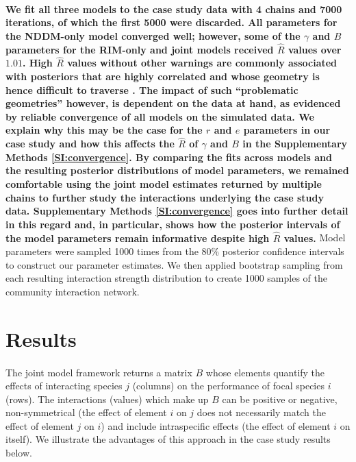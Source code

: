 \documentclass[a4,12pt]{article}
\begin{document}
\begin{refsection}
        \paragraph{}
        \textbf{We fit all three models to the case study data with 4 chains and 7000 iterations, of which the first 5000 were discarded. All parameters for the NDDM-only model converged well; however, some of the $\gamma$ and $B$ parameters for the RIM-only and joint models received $\hat{R}$ values over $1.01$. High $\hat{R}$ values without other warnings are commonly associated with posteriors that are highly correlated and whose geometry is hence difficult to traverse \parencite{Team2022}. The impact of such ``problematic geometries'' however, is dependent on the data at hand, as evidenced by reliable convergence of all models on the simulated data. We explain why this may be the case for the $r$ and $e$ parameters in our case study and how this affects the $\hat{R}$ of $\gamma$ and $B$ in the Supplementary Methods \ref{SI:convergence}. By comparing the fits across models and the resulting posterior distributions of model parameters, we remained comfortable using the joint model estimates returned by multiple chains to further study the interactions underlying the case study data. Supplementary Methods \ref{SI:convergence} goes into further detail in this regard and, in particular, shows how the posterior intervals of the model parameters remain informative despite high $\hat{R}$ values.} Model parameters were sampled 1000 times from the 80\% posterior confidence intervals to construct our parameter estimates. We then applied bootstrap sampling from each resulting interaction strength distribution to create 1000 samples of the community interaction network.

\section{Results}
    
    \paragraph{}
    The joint model framework returns a matrix $B$ whose elements quantify the effects of interacting species $j$ (columns) on the performance of focal species $i$ (rows). The interactions (values) which make up $B$ can be positive or negative, non-symmetrical (the effect of element $i$ on $j$ does not necessarily match the effect of element $j$ on $i$) and include intraspecific effects (the effect of element $i$ on itself). We illustrate the advantages of this approach in the case study results below. 



\end{refsection}
\end{document}

